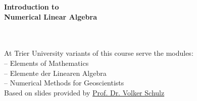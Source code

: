 \setcounter{page}{0}
\setcounter{framenumber}{0}	
\begin{frame}
	\thispagestyle{empty}
	\Vspace{4cm}
	\centering
	{\Huge\bf Introduction to}\\
	\vspace*{0.43cm}
    {\Huge\bf Numerical Linear Algebra}\\
    \Vspace{1cm}
	{\Large\Lecturer}\\
	\Vspace{0.3cm}
	{\small\Semester}\\
\end{frame}
\begin{frame}
	\begin{center}
		\begin{minipage}{0.8\textwidth}
			\vspace*{2cm}
				At Trier University variants of this course serve the modules:\\
			-- Elements of Mathematics \\
			-- Elemente der Linearen Algebra \\
			-- Numerical Methods for Geoscientists
			\vspace*{1.5cm}
			~\\
			Based on slides provided by \href{https://www.math.uni-trier.de/~schulz/}{Prof. Dr. Volker Schulz}\\
			\vspace*{0.5cm}
			~\\
			\begin{minipage}[t]{0.3\textwidth}
				~\\[0.2cm]
				\centering
				{\licensePicture[0.078]}
			\end{minipage}
			\begin{minipage}[t]{0.5\textwidth}
				~\\
				\centering
				{\footnotesize\licenseText}
			\end{minipage}	
		\end{minipage}
	\end{center}
\end{frame}





